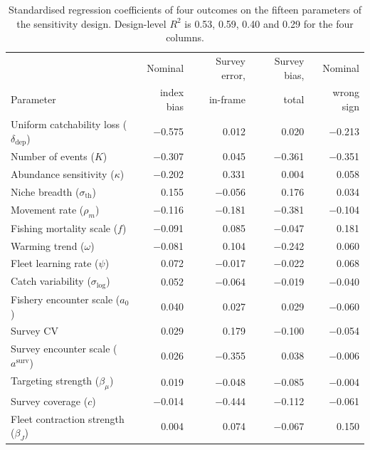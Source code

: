 \documentclass[11pt,a4paper]{article}
\begin{document}
\begin{table}[htbp]
\centering\footnotesize
\caption{Standardised regression coefficients of four outcomes on the fifteen parameters of the sensitivity design. Design-level $R^2$ is 0.53, 0.59, 0.40 and 0.29 for the four columns.}
\label{tab:sens}
\begin{tabular}{@{}lrrrr@{}}
\toprule
 & Nominal & Survey error, & Survey bias, & Nominal \\
Parameter & index bias & in-frame & total & wrong sign \\
\midrule
Uniform catchability loss ($\delta_{\text{dep}}$) & $-$0.575 & 0.012 & 0.020 & $-$0.213 \\
Number of events ($K$) & $-$0.307 & 0.045 & $-$0.361 & $-$0.351 \\
Abundance sensitivity ($\kappa$) & $-$0.202 & 0.331 & 0.004 & 0.058 \\
Niche breadth ($\sigma_{\text{th}}$) & 0.155 & $-$0.056 & 0.176 & 0.034 \\
Movement rate ($\rho_m$) & $-$0.116 & $-$0.181 & $-$0.381 & $-$0.104 \\
Fishing mortality scale ($f$) & $-$0.091 & 0.085 & $-$0.047 & 0.181 \\
Warming trend ($\omega$) & $-$0.081 & 0.104 & $-$0.242 & 0.060 \\
Fleet learning rate ($\psi$) & 0.072 & $-$0.017 & $-$0.022 & 0.068 \\
Catch variability ($\sigma_{\log}$) & 0.052 & $-$0.064 & $-$0.019 & $-$0.040 \\
Fishery encounter scale ($a_0$) & 0.040 & 0.027 & 0.029 & $-$0.060 \\
Survey CV & 0.029 & 0.179 & $-$0.100 & $-$0.054 \\
Survey encounter scale ($a^{\text{surv}}$) & 0.026 & $-$0.355 & 0.038 & $-$0.006 \\
Targeting strength ($\beta_\mu$) & 0.019 & $-$0.048 & $-$0.085 & $-$0.004 \\
Survey coverage ($c$) & $-$0.014 & $-$0.444 & $-$0.112 & $-$0.061 \\
Fleet contraction strength ($\beta_J$) & 0.004 & 0.074 & $-$0.067 & 0.150 \\
\bottomrule
\end{tabular}
\end{table}
\end{document}
